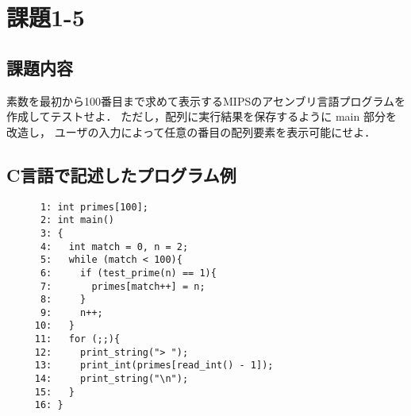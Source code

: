\documentclass[a4j,11pt]{jarticle}
\begin{document}
\section{課題1-5}

\subsection{課題内容}

素数を最初から100番目まで求めて表示するMIPSのアセンブリ言語プログラムを作成してテストせよ． 
ただし，配列に実行結果を保存するように main 部分を改造し， 
ユーザの入力によって任意の番目の配列要素を表示可能にせよ．

\subsection{C言語で記述したプログラム例}

\begin{verbatim}
      1: int primes[100];
      2: int main()
      3: {
      4:   int match = 0, n = 2;
      5:   while (match < 100){
      6:     if (test_prime(n) == 1){
      7:       primes[match++] = n;
      8:     }
      9:     n++;
     10:   }
     11:   for (;;){
     12:     print_string("> ");
     13:     print_int(primes[read_int() - 1]);
     14:     print_string("\n");
     15:   }
     16: }
\end{verbatim}
\end{document}
